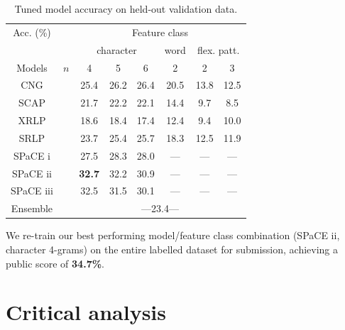 \documentclass[twocolumn,10pt]{article}
\begin{document}
\begin{table}[h]
\centering
\begin{tabular}{@{}cccccccc@{}}
\cmidrule{3-8}
Acc. (\%)   &     & \multicolumn{6}{c}{Feature class}                    \\
\cmidrule{3-8} 
            &     & \multicolumn{3}{c}{character} & word  & \multicolumn{2}{c}{flex. patt.} \\
\cmidrule(r){1-1} \cmidrule(rl){3-5} \cmidrule(rl){6-6} \cmidrule(rl){7-8} 
Models      & $n$ & 4      & 5      & 6           & 2     & 2     & 3    \\
\cmidrule(r){1-1} \cmidrule{3-8} 
CNG         &     & 25.4   & 26.2   & 26.4        & 20.5  & 13.8  & 12.5 \\
SCAP        &     & 21.7   & 22.2   & 22.1        & 14.4  &  9.7  &  8.5 \\
XRLP        &     & 18.6   & 18.4   & 17.4        & 12.4  &  9.4  & 10.0 \\
SRLP        &     & 23.7   & 25.4   & 25.7        & 18.3  & 12.5  & 11.9 \\
SPaCE i     &     & 27.5   & 28.3   & 28.0        & ---   & ---   & ---  \\
SPaCE ii    & &{\bf 32.7}  & 32.2   & 30.9        & ---   & ---   & ---  \\
SPaCE iii   &     & 32.5   & 31.5   & 30.1        & ---   & ---   & ---  \\
                  \cmidrule{3-8} 
Ensemble    &     & \multicolumn{6}{c}{ ---23.4--- }\\ %
\bottomrule
\end{tabular}
\caption{Tuned model accuracy on held-out validation data.}
\label{tab:devresults}
\end{table}

We re-train our best performing model/feature class combination
(SPaCE ii, character 4-grams) on the entire labelled dataset for submission,
achieving a public score of \textbf{34.7\%}.

\section{Critical analysis}


\end{document}
